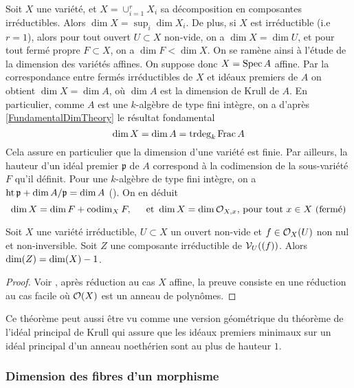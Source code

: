Soit $X$ une variété, et $X=\cup_{i=1}^rX_i$ sa décomposition en composantes irréductibles. Alors $\dim X=\sup_i \dim X_i$. De plus, si $X$ est irréductible (i.e $r=1$), alors pour tout ouvert $U\subset X$ non-vide, on a $\dim X=\dim U$, et pour tout fermé propre $F\subset X$, on a $\dim F<\dim X$. On se ramène ainsi à l'étude de la dimension des variétés affines. On suppose donc $X=\operatorname{Spec} A$ affine. Par la correspondance entre fermés irréductibles de $X$ et idéaux premiers de $A$ on obtient $\dim X= \dim A$, où $\dim A$ est la dimension de Krull de $A$. En particulier, comme $A$ est une $k$-algèbre de type fini intègre, on a d'après \ref{FundamentalDimTheory} le résultat fondamental
$$\dim X=\dim A=\operatorname{trdeg}_k \operatorname{Frac} A$$
Cela assure en particulier que la dimension d'une variété est finie. Par ailleurs, la hauteur d'un idéal premier $\mathfrak{p}$ de $A$ correspond à la codimension de la sous-variété $F$ qu'il définit. Pour une $k$-algèbre de type fini intègre, on a $\operatorname{ht} \mathfrak{p}+ \dim A/\mathfrak{p}=\dim A$ (\cite[13.4]{Eisenbud}). On en déduit
$$\dim X=\dim F+\operatorname{codim}_X F,\,\,\,\,\,\,\, \text{ et } \dim X=\dim\mathcal{O}_{X,x} \text{, pour tout } x\in X \text{ (fermé)}$$

\begin{thm}\label{dimsousvariete}
Soit $X$ une variété irréductible, $U\subset X$ un ouvert non-vide et $f\in \mathcal{O}_X(U)$ non nul et non-inversible. Soit $Z$ une composante irréductible de $\mathcal{V}_U((f))$. Alors $\operatorname{dim}(Z)= \operatorname{dim}(X)-1$.
\end{thm}
\begin{proof}
Voir \cite[I.7 Th.2]{MumfordRedBook}, après réduction au cas $X$ affine, la preuve consiste en une réduction au cas facile où $\mathcal{O}(X)$ est un anneau de polynômes. 
\end{proof}

Ce théorème peut aussi être vu comme une version géométrique du théorème de l'idéal principal de Krull qui assure que les idéaux premiers minimaux sur un idéal principal d'un anneau noethérien sont au plus de hauteur $1$.

\subsubsection{Dimension des fibres d'un morphisme}

